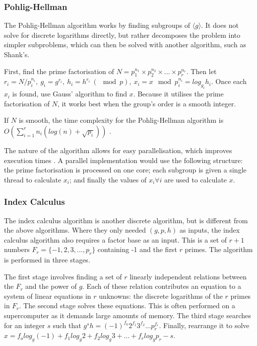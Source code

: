 \documentclass{article}
\begin{document}
\subsubsection{Pohlig-Hellman}

The Pohlig-Hellman algorithm \cite{Pohlig1978An} works by finding subgroups of $\langle g \rangle$. It does not solve for discrete logarithms directly, but rather decomposes the problem into simpler subproblems, which can then be solved with another algorithm, such as Shank's.

First, find the prime factorisation of $N = p_1^{n_1} \times p_2^{n_2} \times ... \times p_r^{n_r}$. Then let $r_i = N / p_i^{n_i}, \ g_i = g^{r_i}, \ h_i = h^{r_i} \ (\mod p), \ x_i = x \mod p_i^{n_i} = log_{g_i}h_i$. Once each $x_i$ is found, use Gauss' algorithm \cite{Gauss1986Disquisitiones} to find $x$. Because it utilises the prime factorisation of $N$, it works best when the group's order is a smooth integer.

If $N$ is smooth, the time complexity for the Pohlig-Hellman algorithm is $O(\sum_{i=1}^r n_i(log(n) + \sqrt{p_i}))$ \cite{Menezes2001Handbook}. 

The nature of the algorithm allows for easy parallelisation, which improves execution times \cite{Sakre2017Parallel}. A parallel implementation would use the following structure: the prime factorisation is processed on one core; each subgroup is given a single thread to calculate $x_i$; and finally the values of $x_i \forall i$ are used to calculate $x$.

\subsubsection{Index Calculus}

The index calculus algorithm \cite{Adleman1979A} is another discrete algorithm, but is different from the above algorithms. Where they only needed $(g, p, h)$ as inputs, the index calculus algorithm also requires a factor base as an input. This is a set of $r+1$ numbers $F_r = \{-1, 2, 3, ..., p_{r}\}$ containing -1 and the first $r$ primes. The algorithm is performed in three stages.

The first stage involves finding a set of $r$ linearly independent relations between the $F_r$ and the power of $g$. Each of these relation contributes an equation to a system of linear equations in $r$ unknowns: the discrete logarithms of the $r$ primes in $F_r$. The second stage solves these equations. This is often performed on a supercomputer as it demands large amounts of memory. The third stage searches for an integer $s$ such that $g^sh = (-1)^{f_0}2^{f_1}3^{f_2}...p_r^{f_r}$. Finally, rearrange it to solve $x=f_olog_g(-1) + f_1log_g2 + f_2log_g3 + ... + f_rlog_gp_r - s$.
\end{document}

